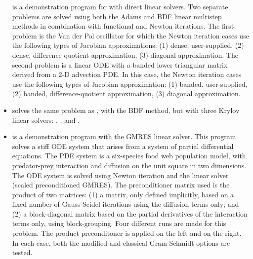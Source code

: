 \begin{itemize}
  is a demonstration program for {\cvode} with direct linear solvers.
  \newline
  Two separate problems are solved using both the Adams and BDF linear
  multistep methods in combination with functional and Newton
  iterations. 
  \newline
  The first problem is the Van der Pol oscillator for which 
  the Newton iteration cases use the following types of Jacobian approximations:
  (1) dense, user-supplied, (2) dense, difference-quotient approximation, 
  (3) diagonal approximation. The second problem is a linear ODE with a
  banded lower triangular matrix derived from a 2-D advection PDE. In this
  case, the Newton iteration cases use the following types of Jacobian
  approximation: (1) banded, user-supplied, (2) banded, difference-quotient
  approximation, (3) diagonal approximation.
\item {}
  solves the same problem as , with the BDF method, but with
  three Krylov linear solvers: {\cvspgmr}, {\cvspbcg}, and {\cvsptfqmr}.
\item {}
  is a demonstration program with the GMRES linear solver.
  \newline
  This program solves a stiff ODE system that arises from a system     
  of partial differential equations.  The PDE system is a six-species
  food web population model, with predator-prey interaction and diffusion 
  on the unit square in two dimensions.
  \newline
  The ODE system is solved using Newton iteration and the      
  {\cvspgmr} linear solver (scaled preconditioned GMRES).
  \newline
  The preconditioner matrix used is the product of two matrices:         
  (1) a matrix, only defined implicitly, based on a fixed number of     
  Gauss-Seidel iterations using the diffusion terms only; and               
  (2) a block-diagonal matrix based on the partial derivatives of the   
  interaction terms only, using block-grouping.                          
  \newline
  Four different runs are made for this problem.                        
  The product preconditoner is applied on the left and on the right.    
  In each case, both the modified and classical Gram-Schmidt options    
  are tested.
\end{itemize}

